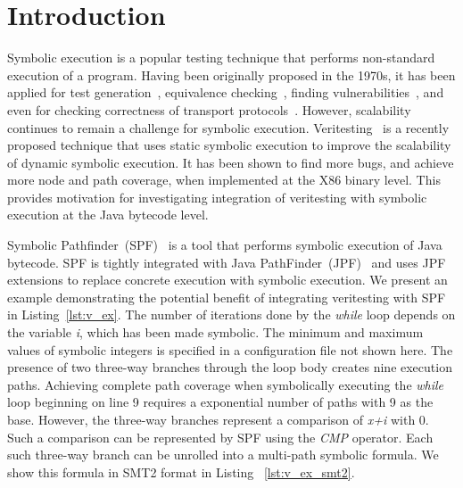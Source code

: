 \section{Introduction}
Symbolic execution is a popular testing technique that performs non-standard execution of a program.
%
Having been originally proposed in the 1970s, it has been applied for test generation~\cite{dart,cute}, equivalence checking~\cite{ramos,adaptorsynth}, finding vulnerabilities~\cite{driller,angr}, and even for checking correctness of transport protocols~\cite{transport}.
%
However, scalability continues to remain a challenge for symbolic execution.
%
Veritesting~\cite{veritesting} is a recently proposed technique that uses static symbolic execution to improve the scalability of dynamic symbolic execution.
%
It has been shown to find more bugs, and achieve more node and path coverage, when implemented at the X86 binary level.
%
This provides motivation for investigating integration of veritesting with symbolic execution at the Java bytecode level.



Symbolic Pathfinder~(SPF)~\cite{spf} is a tool that performs symbolic execution of Java bytecode.
%
SPF is tightly integrated with Java PathFinder~(JPF)~\cite{jpf} and uses JPF extensions to replace concrete execution with symbolic execution.
%
We present an example demonstrating the potential benefit of integrating veritesting with SPF in Listing~\ref{lst:v_ex}.
%
The number of iterations done by the \textit{while} loop depends on the variable \textit{i}, which has been made symbolic.
%
The minimum and maximum values of symbolic integers is specified in a configuration file not shown here.
%
The presence of two three-way branches through the loop body creates nine execution paths.
%
Achieving complete path coverage when symbolically executing the \textit{while} loop beginning on line 9 requires a exponential number of paths with 9 as the base.
%
However, the three-way branches represent a comparison of \textit{x+i} with 0.
%
Such a comparison can be represented by SPF using the \textit{CMP} operator.
%
Each such three-way branch can be unrolled into a multi-path symbolic formula.
%
We show this formula in SMT2 format in Listing ~\ref{lst:v_ex_smt2}.
%
%




